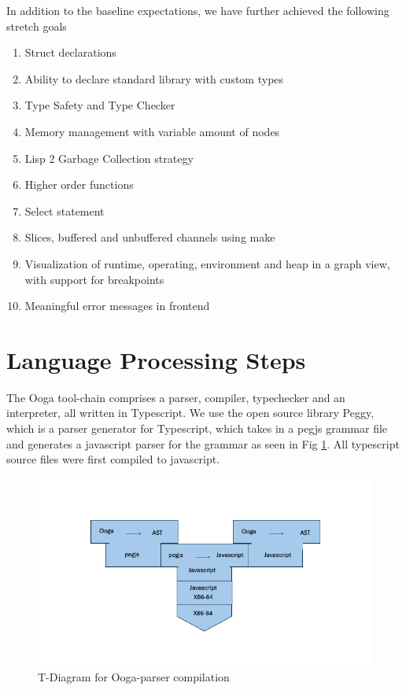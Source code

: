 \documentclass{report}
\begin{document}
In addition to the baseline expectations, we have further achieved the following stretch goals

\begin{enumerate}
    \item Struct declarations
    \item Ability to declare standard library with custom types
    \item Type Safety and Type Checker
    \item Memory management with variable amount of nodes
    \item Lisp 2 Garbage Collection strategy
    \item Higher order functions
    \item Select statement
    \item Slices, buffered and unbuffered channels using make
    \item Visualization of runtime, operating, environment and heap in a graph view, with support for breakpoints
    \item Meaningful error messages in frontend
\end{enumerate}

\section{Language Processing Steps}

The Ooga tool-chain comprises a parser, compiler, typechecker and an interpreter, all written in Typescript. We use the open source library Peggy, which is a parser generator for Typescript, which takes in a pegjs grammar file and generates a javascript parser for the grammar as seen in Fig \ref{fig:ooga-parser-pegjs}. All typescript source files were first compiled to javascript.

\begin{figure}
    \centering
    \includegraphics[width=1.25\linewidth]{ooga-parser-t-diagram.png}
    \caption{T-Diagram for Ooga-parser compilation}
    \label{fig:ooga-parser-pegjs}
\end{figure}
\end{document}
